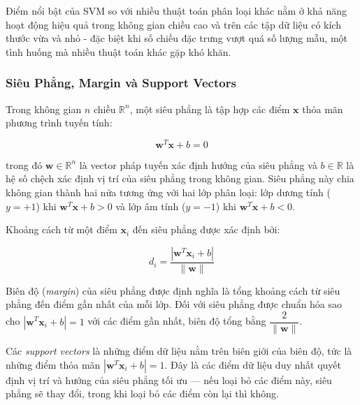Điểm nổi bật của SVM so với nhiều thuật toán phân loại khác nằm ở khả năng hoạt động hiệu quả trong không gian chiều cao và trên các tập dữ liệu có kích thước vừa và nhỏ - đặc biệt khi số chiều đặc trưng vượt quá số lượng mẫu, một tình huống mà nhiều thuật toán khác gặp khó khăn.\\

\subsubsection{Siêu Phẳng, Margin và Support Vectors}

Trong không gian $n$ chiều $\mathbb{R}^n$, một siêu phẳng là tập hợp các điểm $\mathbf{x}$ thỏa mãn phương trình tuyến tính:

\begin{equation}
  \mathbf{w}^T \mathbf{x} + b = 0
  \label{eq:hyperplane}
\end{equation}

\noindent trong đó $\mathbf{w} \in \mathbb{R}^n$ là vector pháp tuyến xác định hướng của siêu phẳng và $b \in \mathbb{R}$ là hệ số chệch xác định vị trí của siêu phẳng trong không gian. Siêu phẳng này chia không gian thành hai nửa tương ứng với hai lớp phân loại: lớp dương tính ($y = +1$) khi $\mathbf{w}^T \mathbf{x} + b > 0$ và lớp âm tính ($y = -1$) khi $\mathbf{w}^T \mathbf{x} + b < 0$.

Khoảng cách từ một điểm $\mathbf{x}_i$ đến siêu phẳng được xác định bởi:

\begin{equation}
  d_i = \frac{|\mathbf{w}^T \mathbf{x}_i + b|}{\|\mathbf{w}\|}
  \label{eq:distance}
\end{equation}

Biên độ (\textit{margin}) của siêu phẳng được định nghĩa là tổng khoảng cách từ siêu phẳng đến điểm gần nhất của mỗi lớp. Đối với siêu phẳng được chuẩn hóa sao cho $|\mathbf{w}^T \mathbf{x}_i + b| = 1$ với các điểm gần nhất, biên độ tổng bằng $\dfrac{2}{\|\mathbf{w}\|}$.

Các \textit{support vectors} là những điểm dữ liệu nằm trên biên giới của biên độ, tức là những điểm thỏa mãn $|\mathbf{w}^T \mathbf{x}_i + b| = 1$. Đây là các điểm dữ liệu duy nhất quyết định vị trí và hướng của siêu phẳng tối ưu --- nếu loại bỏ các điểm này, siêu phẳng sẽ thay đổi, trong khi loại bỏ các điểm còn lại thì không.

